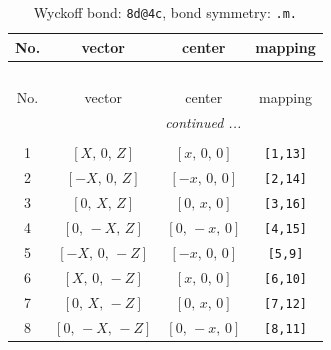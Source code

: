 \documentclass[fleqn,8pt]{jsarticle}
\begin{document}
\begin{longtable}{cccc}
\caption{Wyckoff bond: {\tt 8d@4c}, bond symmetry: {\tt .m.}}
 \\
 \hline \hline
No. & vector & center & mapping \\ \hline \endfirsthead

\multicolumn{3}{l}{\tablename\ \thetable{}} \\
 \hline \hline
No. & vector & center & mapping \\ \hline \endhead

 \hline \hline
\multicolumn{3}{r}{\footnotesize\it continued ...} \\ \endfoot

 \hline \hline
\multicolumn{3}{r}{} \\ \endlastfoot

1 & $\left[ X,\, 0,\, Z \right]$ & $\left[ x,\, 0,\, 0 \right]$ & {\tt [1,13]} \\ \hline
2 & $\left[ - X,\, 0,\, Z \right]$ & $\left[ - x,\, 0,\, 0 \right]$ & {\tt [2,14]} \\ \hline
3 & $\left[ 0,\, X,\, Z \right]$ & $\left[ 0,\, x,\, 0 \right]$ & {\tt [3,16]} \\ \hline
4 & $\left[ 0,\, - X,\, Z \right]$ & $\left[ 0,\, - x,\, 0 \right]$ & {\tt [4,15]} \\ \hline
5 & $\left[ - X,\, 0,\, - Z \right]$ & $\left[ - x,\, 0,\, 0 \right]$ & {\tt [5,9]} \\ \hline
6 & $\left[ X,\, 0,\, - Z \right]$ & $\left[ x,\, 0,\, 0 \right]$ & {\tt [6,10]} \\ \hline
7 & $\left[ 0,\, X,\, - Z \right]$ & $\left[ 0,\, x,\, 0 \right]$ & {\tt [7,12]} \\ \hline
8 & $\left[ 0,\, - X,\, - Z \right]$ & $\left[ 0,\, - x,\, 0 \right]$ & {\tt [8,11]} \\
\end{longtable}
\renewcommand{\arraystretch}{1.2}
\end{document}
